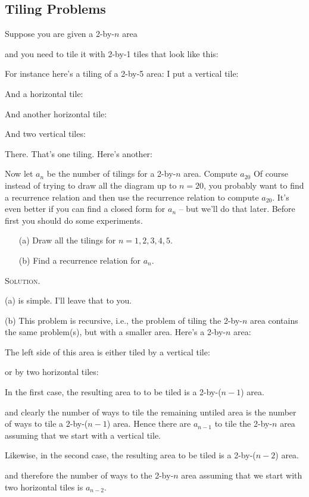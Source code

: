 \subsection{Tiling Problems}

\begin{eg}
Suppose you are given a 2-by-$n$ area

and you need to tile it with 2-by-1 tiles that look like this:

For instance here's a tiling of a 2-by-5 area:
I put a vertical tile:

And a horizontal tile:

And another horizontal tile:

And two vertical tiles:

There. That's one tiling. Here's another:

Now let $a_n$ be the number of tilings
for a 2-by-$n$ area.
Compute $a_{20}$
Of course instead of trying to draw all the diagram up to $n = 20$,
you probably want to find a recurrence relation and then use the
recurrence relation to compute $a_{20}$.
It's even better if you can find a closed form for $a_n$ -- but
we'll do that later.
Before first you should do some experiments.
\begin{enumerate}[nosep]
  \item[(a)] Draw all the tilings for $n=1, 2, 3, 4, 5$.
  \item[(b)] Find a recurrence relation for $a_n$.
\end{enumerate}
\end{eg}

\textsc{Solution.}

(a) is simple. I'll leave that to you.

(b)
This problem is recursive, i.e., the problem of
tiling the 2-by-$n$ area contains the same problem(s), but with a
smaller area.
Here's a 2-by-$n$ area:


The left side of this area is either tiled by a vertical tile:

or by two horizontal tiles:


In the first case, the resulting area to to be tiled is a 2-by-($n-1$) area.

and clearly the number of ways to tile the remaining untiled area
is the number of ways to tile a 2-by-($n-1$) area.
Hence there are $a_{n-1}$ to tile the 2-by-$n$ area assuming that we
start with a vertical tile.

Likewise, in the second case,
the resulting area to be tiled is a 2-by-($n-2$) area.

and therefore the number of ways to the 2-by-$n$ area assuming that
we start with two horizontal tiles is $a_{n-2}$.

